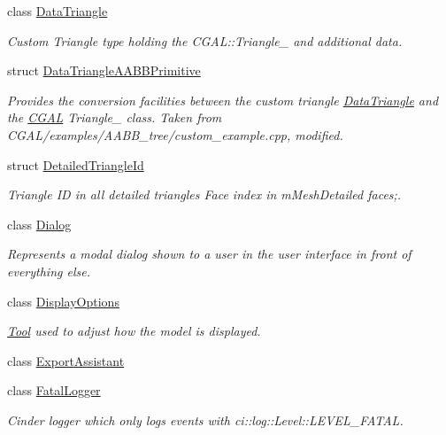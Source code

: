 \begin{DoxyCompactItemize}
class \mbox{\hyperlink{classpepr3d_1_1_data_triangle}{Data\+Triangle}}
\begin{DoxyCompactList}\small\item\em Custom Triangle type holding the C\+G\+A\+L\+::\+Triangle\+\_ and additional data. \end{DoxyCompactList}\item 
struct \mbox{\hyperlink{structpepr3d_1_1_data_triangle_a_a_b_b_primitive}{Data\+Triangle\+A\+A\+B\+B\+Primitive}}
\begin{DoxyCompactList}\small\item\em Provides the conversion facilities between the custom triangle \mbox{\hyperlink{classpepr3d_1_1_data_triangle}{Data\+Triangle}} and the \mbox{\hyperlink{namespace_c_g_a_l}{C\+G\+AL}} Triangle\+\_ class. Taken from C\+G\+A\+L/examples/\+A\+A\+B\+B\+\_\+tree/custom\+\_\+example.\+cpp, modified. \end{DoxyCompactList}\item 
struct \mbox{\hyperlink{structpepr3d_1_1_detailed_triangle_id}{Detailed\+Triangle\+Id}}
\begin{DoxyCompactList}\small\item\em Triangle ID in all detailed triangles Face index in m\+Mesh\+Detailed faces;. \end{DoxyCompactList}\item 
class \mbox{\hyperlink{classpepr3d_1_1_dialog}{Dialog}}
\begin{DoxyCompactList}\small\item\em Represents a modal dialog shown to a user in the user interface in front of everything else. \end{DoxyCompactList}\item 
class \mbox{\hyperlink{classpepr3d_1_1_display_options}{Display\+Options}}
\begin{DoxyCompactList}\small\item\em \mbox{\hyperlink{classpepr3d_1_1_tool}{Tool}} used to adjust how the model is displayed. \end{DoxyCompactList}\item 
class \mbox{\hyperlink{classpepr3d_1_1_export_assistant}{Export\+Assistant}}
\item 
class \mbox{\hyperlink{classpepr3d_1_1_fatal_logger}{Fatal\+Logger}}
\begin{DoxyCompactList}\small\item\em Cinder logger which only logs events with ci\+::log\+::\+Level\+::\+L\+E\+V\+E\+L\+\_\+\+F\+A\+T\+AL. \end{DoxyCompactList}\item 

\end{DoxyCompactItemize}
